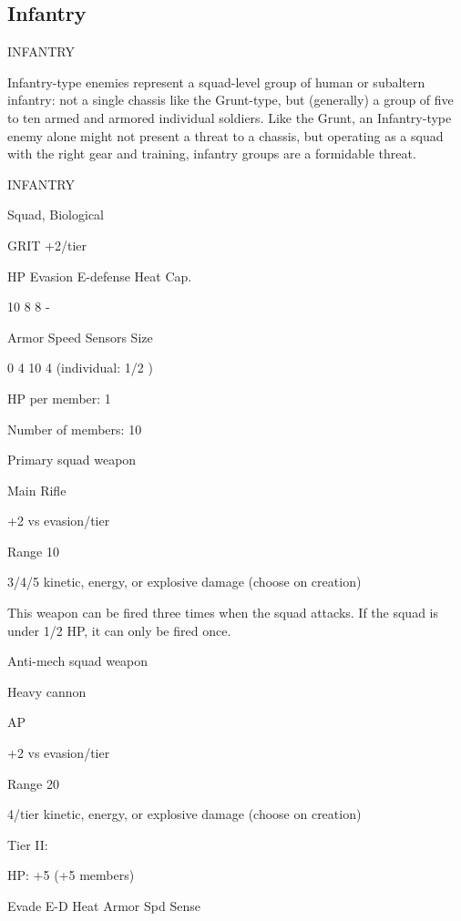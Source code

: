 \subsection{Infantry}
                                               INFANTRY   

Infantry-type enemies represent a squad-level group of human or subaltern infantry: not a single  
chassis like the Grunt-type, but (generally) a group of five to ten armed and armored individual  
soldiers. Like the Grunt, an Infantry-type enemy alone might not present a threat to a chassis, but  
operating as a squad with the right gear and training, infantry groups are a formidable threat.    

       INFANTRY 

       Squad, Biological 

       GRIT +2/tier 

       HP         Evasion      E-defense     Heat Cap. 

       10         8            8             - 

       Armor      Speed       Sensors        Size 

       0          4            10            4 (individual:  
                                             1/2 ) 

HP per member: 1
 
Number of members: 10
 

Primary squad weapon
 
Main Rifle
 
+2 vs evasion/tier
 
Range 10
 
3/4/5 kinetic, energy, or explosive damage (choose on creation)
 
This weapon can be fired three times when the squad attacks. If the squad is under 1/2 HP, it can  
only be fired once.
 

Anti-mech squad weapon
 
Heavy cannon
 
AP
 
+2 vs evasion/tier
 
Range 20
 
4/tier kinetic, energy, or explosive damage (choose on creation)
 

Tier II:
 
HP: +5 (+5 members)
 

       Evade    E-D    Heat    Armor       Spd      Sense 

                                                                                                           


